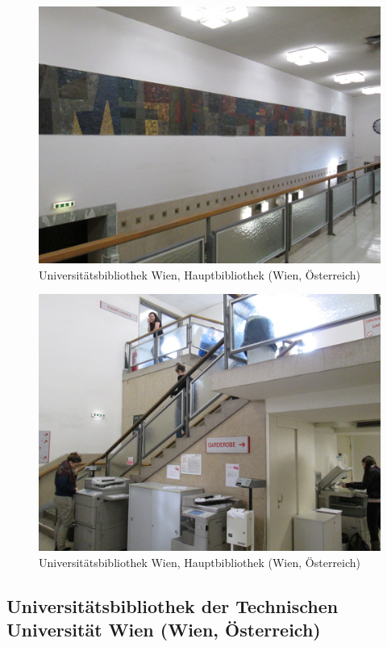 \documentclass[a4paper,
fontsize=11pt,
oneside,
numbers=noperiodatend,
parskip=half-,
bibliography=totoc,
final
]{scrartcl}
\begin{document}
\begin{figure}[htbp]
\centering
\includegraphics{./img/040.jpg}
\caption{Universitätsbibliothek Wien, Hauptbibliothek (Wien,
Österreich)}
\end{figure}

\begin{figure}[htbp]
\centering
\includegraphics{./img/041.jpg}
\caption{Universitätsbibliothek Wien, Hauptbibliothek (Wien,
Österreich)}
\end{figure}

\subsection*{Universitätsbibliothek der Technischen Universität Wien
(Wien,
Österreich)}\label{universituxe4tsbibliothek-der-technischen-universituxe4t-wien-wien-uxf6sterreich}
\end{document}
